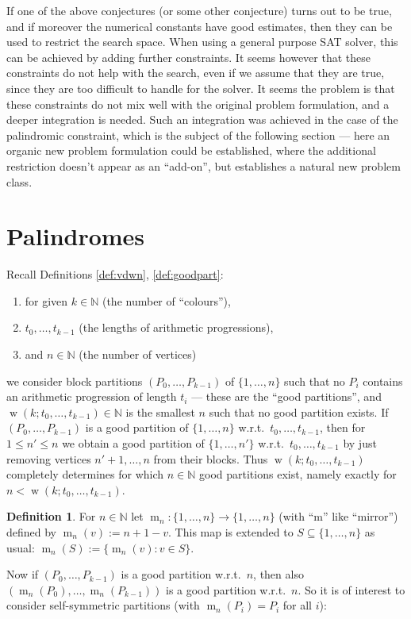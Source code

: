 \documentclass[final,3p,times]{elsarticle}
\theoremstyle{definition}
\newtheorem{defn}{Definition}[section]
\newcommand{\set}[1]{\{#1\}}
\renewcommand{\leq}{\le} %
\newcommand{\NN}{\mathbb{N}}
\DeclareMathOperator{\vdw}{w}
\DeclareMathOperator{\mir}{m}
\begin{document}
If one of the above conjectures (or some other conjecture) turns out to be true, and if moreover the numerical constants have good estimates, then they can be used to restrict the search space. When using a general purpose SAT solver, this can be achieved by adding further constraints. It seems however that these constraints do not help with the search, even if we assume that they are true, since they are too difficult to handle for the solver. It seems the problem is that these constraints do not mix well with the original problem formulation, and a deeper integration is needed. Such an integration was achieved in the case of the palindromic constraint, which is the subject of the following section --- here an organic new problem formulation could be established, where the additional restriction doesn't appear as an ``add-on'', but establishes a natural new problem class.




\section{Palindromes}
\label{sec:Palindromes}

Recall Definitions \ref{def:vdwn}, \ref{def:goodpart}:
\begin{enumerate}
\item for given $k \in \NN$ (the number of ``colours''),
\item $t_0, \dots, t_{k-1}$ (the lengths of arithmetic progressions),
\item and $n \in \NN$ (the number of vertices)
\end{enumerate}
we consider block partitions $(P_0, \dots, P_{k-1})$ of $\set{1, \dots, n}$ such that no $P_i$ contains an arithmetic progression of length $t_i$ --- these are the ``good partitions'', and $\vdw(k; t_0, \dots, t_{k-1}) \in \NN$ is the smallest $n$ such that no good partition exists. If $(P_0, \dots, P_{k-1})$ is a good partition of $\set{1,\dots,n}$ w.r.t.\ $t_0, \dots, t_{k-1}$, then for $1 \leq n' \leq n$ we obtain a good partition of $\set{1,\dots,n'}$ w.r.t.\ $t_0, \dots, t_{k-1}$ by just removing vertices $n'+1, \dots, n$ from their blocks. Thus $\vdw(k; t_0, \dots, t_{k-1})$ completely determines for which $n \in \NN$ good partitions exist, namely exactly for $n < \vdw(k; t_0, \dots, t_{k-1})$.

\begin{defn}\label{def:mirror}
  For $n \in \NN$ let $\mir_n: \set{1,\dots,n} \rightarrow \set{1,\dots,n}$ (with ``m'' like ``mirror'') defined by $\mir_n(v) := n+1-v$. This map is extended to $S \subseteq \set{1,\dots,n}$ as usual: $\mir_n(S) := \set{\mir_n(v) : v \in S}$.
\end{defn}
Now if $(P_0, \dots, P_{k-1})$ is a good partition w.r.t.\ $n$, then also $(\mir_n(P_0), \dots, \mir_n(P_{k-1}))$ is a good partition w.r.t.\ $n$. So it is of interest to consider self-symmetric partitions (with $\mir_n(P_i) = P_i$ for all $i$):
\end{document}
